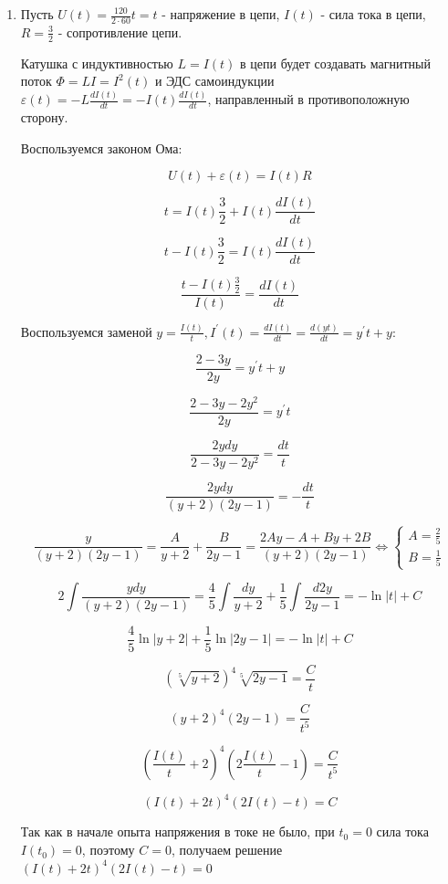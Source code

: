 \begin{enumerate}[label=\Alph*.]
    \item Пусть $U(t) = \frac{120}{2 \cdot 60}t = t$ - напряжение в цепи, $I(t)$ - сила тока в цепи, $R = \frac{3}{2}$ - сопротивление цепи.

    Катушка с индуктивностью $L = I(t)$ в цепи будет создавать магнитный поток $\Phi = LI = I^2(t)$ и
    ЭДС самоиндукции $\varepsilon(t) = -L\frac{dI(t)}{dt} = -I(t)\frac{dI(t)}{dt}$, направленный в противоположную сторону.

    Воспользуемся законом Ома:

    \[U(t) + \varepsilon(t) = I(t)R\]

    \[t = I(t)\frac{3}{2} + I(t)\frac{dI(t)}{dt}\]

    \[t - I(t)\frac{3}{2} = I(t)\frac{dI(t)}{dt}\]

    \[\frac{t - I(t)\frac{3}{2}}{I(t)} = \frac{dI(t)}{dt}\]

    Воспользуемся заменой $y = \frac{I(t)}{t}, I^\prime(t) = \frac{dI(t)}{dt} = \frac{d(yt)}{dt} = y^\prime t + y$:


    \[\frac{2 - 3y}{2y} = y^{\prime} t + y\]

    \[\frac{2 - 3y - 2y^{2}}{2y} = y^{\prime} t\]

    \[\frac{2ydy}{2 - 3y - 2y^{2}} = \frac{dt}{t}\]

    \[\frac{2ydy}{(y + 2)\left(2y - 1\right)} = -\frac{dt}{t}\]

    \[\frac{y}{(y + 2)\left(2y - 1\right)} = \frac{A}{y + 2} + \frac{B}{2y - 1} = \frac{2Ay - A + By + 2B}{(y + 2)(2y - 1)} \Longleftrightarrow \begin{cases}A = \frac{2}{5} \\ B =\frac{1}{5}\end{cases}\]

    \[2\int \frac{ydy}{(y + 2)(2y - 1)} = \frac{4}{5} \int \frac{dy}{y + 2} + \frac{1}{5} \int \frac{d2y}{2y - 1} = -\ln |t| + C\]

    \[\frac{4}{5} \ln |y + 2| + \frac{1}{5} \ln |2y - 1| = -\ln |t| + C\]

    \[\left(\sqrt[5]{y + 2}\right)^4 \sqrt[5]{2y - 1} = \frac{C}{t}\]

    \[(y + 2)^4 (2y - 1) = \frac{C}{t^5}\]

    \[\left(\frac{I(t)}{t} + 2\right)^4 \left(2\frac{I(t)}{t} - 1\right) = \frac{C}{t^5}\]

    \[(I(t) + 2t)^4 (2I(t) - t) = C\]


    Так как в начале опыта напряжения в токе не было, при $t_0 = 0$ сила тока $I(t_0) = 0$, поэтому $C = 0$, получаем решение $(I(t) + 2t)^4 (2I(t) - t) = 0$


\end{enumerate}
